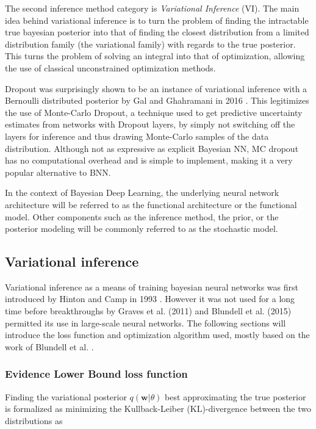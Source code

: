 	The second inference method category is \textit{Variational Inference} (VI). The main idea behind variational inference is to turn the problem of finding the intractable true bayesian posterior into that of finding the closest distribution from a limited distribution family (the variational family) with regards to the true posterior. This turns the problem of solving an integral into that of optimization, allowing the use of classical unconstrained optimization methods. 
	
	Dropout was surprisingly shown to be an instance of variational inference with a Bernoulli distributed posterior by Gal and Ghahramani in 2016 \cite{gal_dropout_2016}. This legitimizes the use of Monte-Carlo Dropout, a technique used to get predictive uncertainty estimates from networks with Dropout layers, by simply not switching off the layers for inference and thus drawing Monte-Carlo samples of the data distribution. Although not as expressive as explicit Bayesian NN, MC dropout has no computational overhead and is simple to implement, making it a very popular alternative to BNN. 
	
	In the context of Bayesian Deep Learning, the underlying neural network architecture will be referred to as the functional architecture or the functional model. Other components such as the inference method, the prior,  or the posterior modeling will be commonly referred to as the stochastic model. 
	
	

\subsection{Variational inference}
\label{section:vi}


	Variational inference as a means of training bayesian neural networks was first introduced by Hinton and Camp in 1993 \cite{hinton_keeping_1993}. However it was not used for a long time before breakthroughs by Graves et al. (2011) \cite{graves_practical_2011} and Blundell et al. (2015) \cite{blundell_weight_2015} permitted its use in large-scale neural networks. The following sections will introduce the loss function and optimization algorithm used, mostly based on the work of Blundell et al. \cite{blundell_weight_2015}.
	
	\subsubsection*{Evidence Lower Bound loss function}
	Finding the variational posterior $q(\pmb{w}|\theta)$ best approximating the true posterior is formalized as minimizing the Kullback-Leiber (KL)-divergence between the two distributions as 
	
